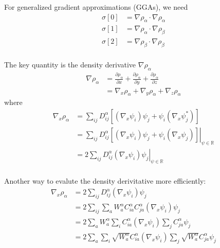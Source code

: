 \documentclass[a4paper,12pt]{article}
\begin{document}
For generalized gradient approximations (GGAs), we need 
\begin{equation}
	\begin{split}
	    \sigma[0] &= \nabla \rho_{\alpha}\cdot \nabla \rho_{\alpha}\\
	    \sigma[1] &= \nabla \rho_{\alpha}\cdot \nabla \rho_{\beta}\\
	    \sigma[2] &= \nabla \rho_{\beta} \cdot \nabla \rho_{\beta}\\
    \end{split}
\end{equation}

The key quantity is the density derivative $\nabla \rho_{\alpha}$
\begin{equation}
	\begin{split}
		\nabla \rho_{\alpha} &= \frac{\partial \rho_{\alpha}} {\partial x}
		                      + \frac{\partial \rho_{\alpha}} {\partial y}
							  + \frac{\partial \rho_{\alpha}} {\partial z} \\
							  &= \nabla_{x} \rho_{\alpha} + \nabla_{y} \rho_{\alpha} + \nabla_{z} \rho_{\alpha} 
	\end{split}
\end{equation}
where
\begin{equation}
	\begin{split}
		\nabla_x \rho_{\alpha} &= \sum_{ij}D_{ij}^{\alpha}\left[(\nabla_x \psi_i)\psi_j + \psi_i(\nabla_x \psi_j^*)\right]\\
		&= \left.\sum_{ij}D_{ij}^{\alpha}\left[(\nabla_x \psi_i)\psi_j + \psi_i(\nabla_x \psi_j)\right]\right|_{\psi\in\mathbb{R}}\\
		&= \left.2\sum_{ij}D_{ij}^{\alpha}(\nabla_x \psi_i)\psi_j\right|_{\psi\in\mathbb{R}}\\
	\end{split}
\end{equation}

Another way to evalute the density derivitative more efficiently:
\begin{equation}
	\begin{split}
		\nabla_x \rho_{\alpha} &= 2\sum_{ij}D_{ij}^{\alpha}(\nabla_x \psi_i)\psi_j\\
		&=2\sum_{ij}\sum_{a}W_{a}^{\alpha}C_{ia}^{\alpha}C_{ja}^{\alpha}(\nabla_x \psi_i)\psi_j\\
		&=2\sum_{a}W_{a}^{\alpha}\sum_{i}C_{ia}^{\alpha}(\nabla_x \psi_i)\sum_{j}C_{ja}^{\alpha}\psi_j\\
		&=2\sum_{a}\sum_{i}\sqrt{W_{a}^{\alpha}}C_{ia}^{\alpha}(\nabla_x \psi_i)\sum_{j}\sqrt{W_{a}^{\alpha}}C_{ja}^{\alpha}\psi_j\\
	\end{split}
\end{equation}
\end{document}
